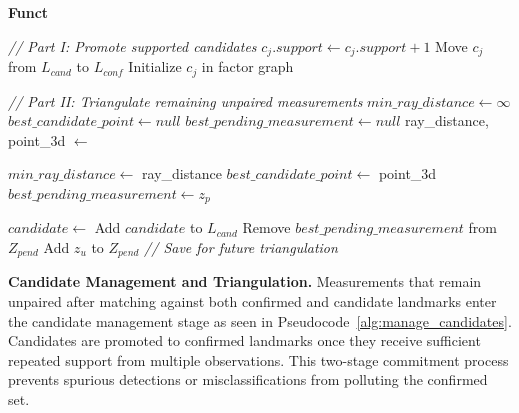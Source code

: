 \documentclass[
	parspace, %
	noindent, %
	final, %
]{elteikthesis}
\begin{document}
\begin{algorithm}[h]
\caption{Candidate Promotion and Triangulation} 
\label{alg:manage_candidates} 
\textbf{Funct} 
\begin{algorithmic}[1]
    \State \textit{// Part I: Promote supported candidates}
        \State $c_j.support \leftarrow c_j.support + 1$
            \State Move $c_j$ from $L_{cand}$ to $L_{conf}$
            \State Initialize $c_j$ in factor graph
        \EndIf
    \EndFor
    
    \State \textit{// Part II: Triangulate remaining unpaired measurements}
		\State $min\_ray\_distance \leftarrow \infty$
        \State $best\_candidate\_point \leftarrow null$
        \State $best\_pending\_measurement \leftarrow null$
            \State ray\_distance, point\_3d $\leftarrow$ 
            
                \State $min\_ray\_distance \leftarrow$ ray\_distance
                \State $best\_candidate\_point \leftarrow$ point\_3d
                \State $best\_pending\_measurement \leftarrow z_p$
            \EndIf
        \EndFor
        
			\State $candidate \leftarrow$ 
			\State Add $candidate$ to $L_{cand}$
			\State Remove $best\_pending\_measurement$ from $Z_{pend}$
        \Else
            \State Add $z_u$ to $Z_{pend}$ \textit{// Save for future triangulation}
        \EndIf
    \EndFor
\end{algorithmic}
\end{algorithm}

\textbf{Candidate Management and Triangulation.} Measurements that remain unpaired after matching against both confirmed and candidate landmarks enter the candidate management stage as seen in Pseudocode~\ref{alg:manage_candidates}. Candidates are promoted to confirmed landmarks once they receive sufficient repeated support from multiple observations. This two-stage commitment process prevents spurious detections or misclassifications from polluting the confirmed set.
\end{document}
